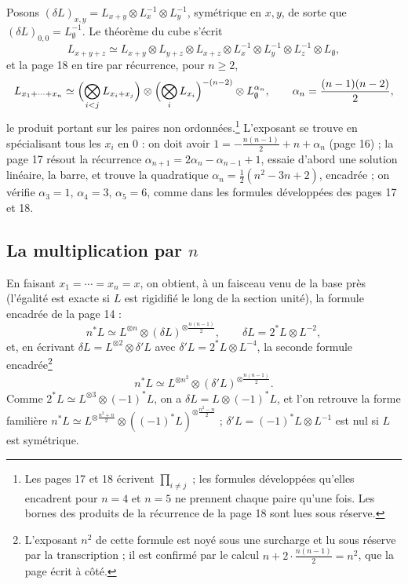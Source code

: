 \documentclass[11pt,a4paper]{article}
\begin{document}
Posons $(\delta L)_{x,y} = L_{x+y} \otimes L_x^{-1} \otimes L_y^{-1}$,
symétrique en $x, y$, de sorte que $(\delta L)_{0,0} = L_\emptyset^{-1}$. Le
théorème du cube s'écrit
\[
L_{x+y+z} \simeq L_{x+y} \otimes L_{y+z} \otimes L_{x+z} \otimes L_x^{-1} \otimes L_y^{-1} \otimes L_z^{-1} \otimes L_\emptyset ,
\]
et la page 18 en tire par récurrence, pour $n \geq 2$,
\[
L_{x_1 + \cdots + x_n} \simeq \Bigl(\bigotimes_{i<j} L_{x_i + x_j}\Bigr) \otimes \Bigl(\bigotimes_i L_{x_i}\Bigr)^{-(n-2)} \otimes L_\emptyset^{\alpha_n},
\qquad \alpha_n = \frac{(n-1)(n-2)}{2} ,
\]
le produit portant sur les paires non ordonnées.\footnote{Les pages 17 et 18
écrivent $\prod_{i \neq j}$ ; les formules développées qu'elles encadrent pour
$n = 4$ et $n = 5$ ne prennent chaque paire qu'une fois. Les bornes des
produits de la récurrence de la page 18 sont lues sous réserve.} L'exposant se
trouve en spécialisant tous les $x_i$ en $0$ : on doit avoir
$1 = -\frac{n(n-1)}{2} + n + \alpha_n$ (page 16) ; la page 17 résout la
récurrence $\alpha_{n+1} = 2\alpha_n - \alpha_{n-1} + 1$, essaie d'abord une
solution linéaire, la barre, et trouve la quadratique
$\alpha_n = \frac12(n^2 - 3n + 2)$, encadrée ; on vérifie
$\alpha_3 = 1$, $\alpha_4 = 3$, $\alpha_5 = 6$, comme dans les formules
développées des pages 17 et 18.

\subsection*{La multiplication par $n$}

En faisant $x_1 = \cdots = x_n = x$, on obtient, à un faisceau venu de la base
près (l'égalité est exacte si $L$ est rigidifié le long de la section unité), la
formule encadrée de la page 14 :
\[
n^*L \simeq L^{\otimes n} \otimes (\delta L)^{\otimes \frac{n(n-1)}{2}},
\qquad \delta L = 2^*L \otimes L^{-2} ,
\]
et, en écrivant $\delta L = L^{\otimes 2} \otimes \delta' L$ avec
$\delta' L = 2^*L \otimes L^{-4}$, la seconde formule encadrée\footnote{L'exposant
$n^2$ de cette formule est noyé sous une surcharge et lu sous réserve par la
transcription ; il est confirmé par le calcul
$n + 2 \cdot \frac{n(n-1)}{2} = n^2$, que la page écrit à côté.}
\[
n^*L \simeq L^{\otimes n^2} \otimes (\delta' L)^{\otimes \frac{n(n-1)}{2}} .
\]
Comme
$2^*L \simeq L^{\otimes 3} \otimes (-1)^*L$, on a
$\delta L = L \otimes (-1)^*L$, et l'on retrouve la forme familière
$n^*L \simeq L^{\otimes \frac{n^2+n}{2}} \otimes ((-1)^*L)^{\otimes \frac{n^2-n}{2}}$ ;
$\delta' L = (-1)^*L \otimes L^{-1}$ est nul si $L$ est symétrique.
\end{document}
